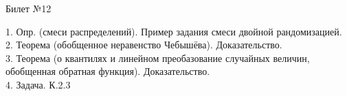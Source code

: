 \documentclass[preview]{standalone}
\begin{document}
 
\begin{center} {\Large Билет №12} \end{center} 

1.  Опр. (смеси распределений). Пример задания смеси двойной рандомизацией.\\

2.  Теорема (обобщенное неравенство Чебышёва). Доказательство.\\

3.  Теорема (о квантилях и линейном преобазование случайных величин, обобщенная обратная функция). Доказательство.\\

4. Задача. К.2.3\\
\end{document}
